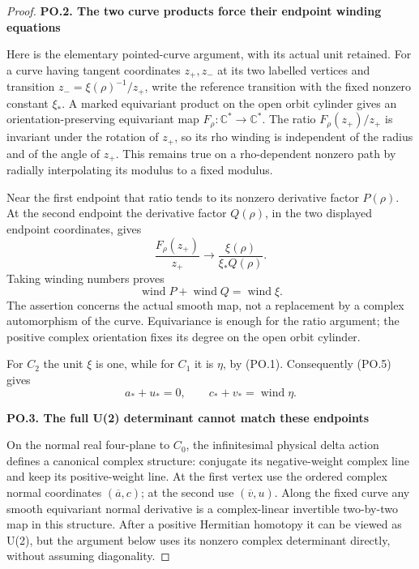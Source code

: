 \begin{proof}
\par

\medskip\noindent\textbf{PO.2. The two curve products force their endpoint winding equations}

\par\nobreak

Here is the elementary pointed-curve argument, with its actual unit
retained. For a curve having tangent coordinates \(z_+,z_-\) at its
two labelled vertices and transition
\(z_-=\xi(\rho)^{-1}/z_+\), write the reference transition with the
fixed nonzero constant \(\xi_*\). A marked equivariant product on
the open orbit cylinder gives an orientation-preserving equivariant
map \(F_\rho:\mathbb C^*\to\mathbb C^*\). The ratio
\(F_\rho(z_+)/z_+\) is invariant under the rotation of \(z_+\), so
its rho winding is independent of the radius and of the angle of
\(z_+\). This remains true on a rho-dependent nonzero path by
radially interpolating its modulus to a fixed modulus.

Near the first endpoint that ratio tends to its nonzero derivative
factor \(P(\rho)\). At the second endpoint the derivative factor
\(Q(\rho)\), in the two displayed endpoint coordinates, gives
\[
 \frac{F_\rho(z_+)}{z_+}
          \longrightarrow\frac{\xi(\rho)}{\xi_*Q(\rho)}.
\]
Taking winding numbers proves
\[
                   \operatorname{wind}P+
                   \operatorname{wind}Q
                         =\operatorname{wind}\xi.       \tag{PO.5}
\]
The assertion concerns the actual smooth map, not a replacement by
a complex automorphism of the curve. Equivariance is enough for the
ratio argument; the positive complex orientation fixes its degree
on the open orbit cylinder.

For \(C_2\) the unit \(\xi\) is one, while for \(C_1\) it is
\(\eta\), by (PO.1). Consequently (PO.5) gives
\[
                 a_*+u_*=0,\qquad
                 c_*+v_* =\operatorname{wind}\eta.     \tag{PO.6}
\]

\par

\medskip\noindent\textbf{PO.3. The full U(2) determinant cannot match these endpoints}

\par\nobreak

On the normal real four-plane to \(C_0\), the infinitesimal physical
delta action defines a canonical complex structure: conjugate its
negative-weight complex line and keep its positive-weight line. At
the first vertex use the ordered complex normal coordinates
\((\overline a,c)\); at the second use
\((\overline v,u)\). Along the fixed curve any smooth equivariant
normal derivative is a complex-linear invertible two-by-two map in
this structure. After a positive Hermitian homotopy it can be viewed
as U(2), but the argument below uses its nonzero complex determinant
directly, without assuming diagonality.


\end{proof}
